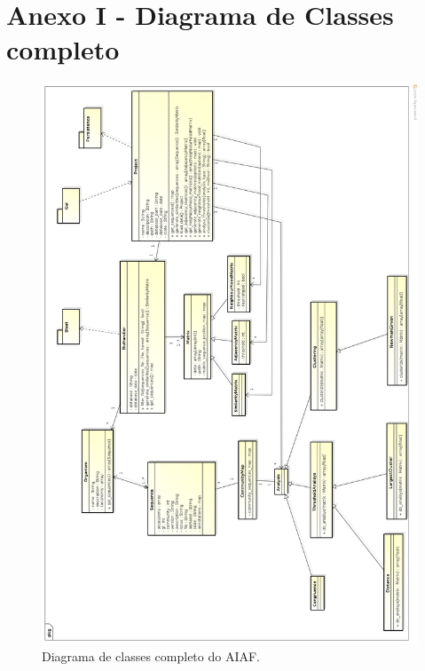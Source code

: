 \appendix

\chapter{Anexo I - Diagrama de Classes completo}

\begin{figure}
\centering
\includegraphics[scale=0.28]{diagrama-classes-completo}
\caption{Diagrama de classes completo do AIAF.}
\label{fig:diagrama-classes-completo}
\end{figure}
